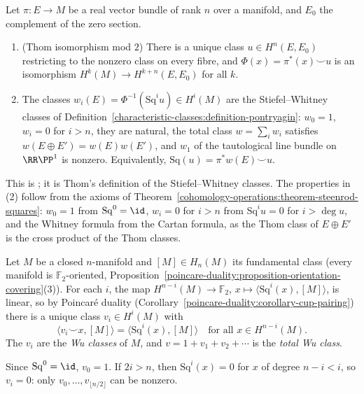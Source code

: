 \begin{theorem}[Thom]\label{characteristic-classes:theorem-stiefel-whitney-thom}
Let $\pi \colon E \to M$ be a real vector bundle of rank $n$ over a manifold, and $E_0$ the complement of the zero section.
\begin{enumerate}
\item (Thom isomorphism mod $2$) There is a unique class $u \in H^n(E, E_0)$ restricting to the nonzero class on every fibre, and
$\Phi(x) = \pi^*(x) \smile u$ is an isomorphism $H^k(M) \to H^{k+n}(E, E_0)$ for all $k$.
\item The classes $w_i(E) = \Phi^{-1}(\mathrm{Sq}^i u) \in H^i(M)$ are the Stiefel--Whitney classes of
Definition~\ref{characteristic-classes:definition-pontryagin}: $w_0 = 1$, $w_i = 0$ for $i > n$, they are natural, the total class
$w = \sum_iw_i$ satisfies $w(E \oplus E') = w(E)w(E')$, and $w_1$ of the tautological line bundle on $\RR\PP^1$ is nonzero. Equivalently,
$\mathrm{Sq}(u) = \pi^*w(E) \smile u$.
\end{enumerate}
\end{theorem}

This is \cite[Chapters 8 and 10]{milnor-stasheff}; it is Thom's definition of the Stiefel--Whitney classes. The properties in (2) follow from the
axioms of Theorem~\ref{cohomology-operations:theorem-steenrod-squares}: $w_0 = 1$ from $\mathrm{Sq}^0 = \id$, $w_i = 0$ for $i > n$ from
$\mathrm{Sq}^iu = 0$ for $i > \deg u$, and the Whitney formula from the Cartan formula, as the Thom class of $E \oplus E'$ is the cross product of
the Thom classes.

\begin{definition}\label{characteristic-classes:definition-wu-classes}
Let $M$ be a closed $n$-manifold and $[M] \in H_n(M)$ its fundamental class (every manifold is $\mathbb{F}_2$-oriented,
Proposition~\ref{poincare-duality:proposition-orientation-covering}(3)). For each $i$, the map $H^{n-i}(M) \to \mathbb{F}_2$,
$x \mapsto \langle\mathrm{Sq}^i(x), [M]\rangle$, is linear, so by Poincar\'e duality (Corollary~\ref{poincare-duality:corollary-cup-pairing}) there is a
unique class $v_i \in H^i(M)$ with
\[
\langle v_i \smile x, [M]\rangle = \langle\mathrm{Sq}^i(x), [M]\rangle \quad \text{for all } x \in H^{n-i}(M).
\]
The $v_i$ are the \emph{Wu classes} of $M$, and $v = 1 + v_1 + v_2 + \cdots$ is the \emph{total Wu class}.
\end{definition}

Since $\mathrm{Sq}^0 = \id$, $v_0 = 1$. If $2i > n$, then $\mathrm{Sq}^i(x) = 0$ for $x$ of degree $n - i < i$, so $v_i = 0$: only
$v_0, \ldots, v_{\lfloor n/2\rfloor}$ can be nonzero.

